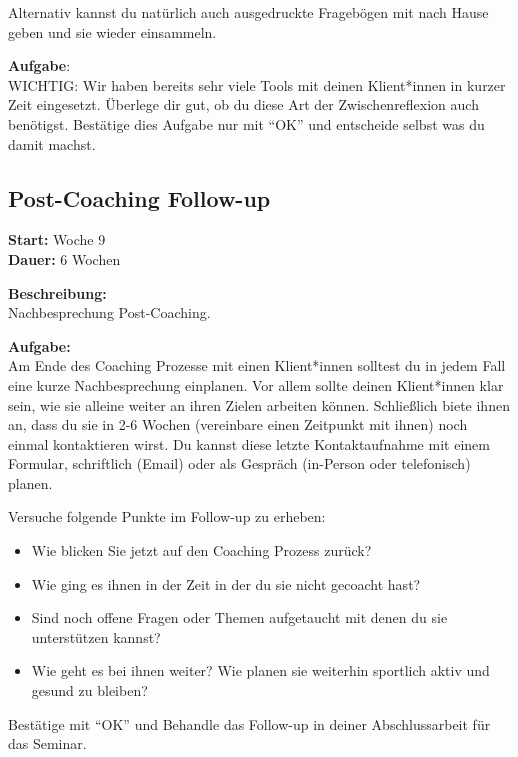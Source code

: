 \documentclass[
  letterpaper,
  DIV=11,
  numbers=noendperiod]{scrreprt}
\begin{document}
Alternativ kannst du natürlich auch ausgedruckte Fragebögen mit nach
Hause geben und sie wieder einsammeln.

\textbf{Aufgabe}:\\
WICHTIG: Wir haben bereits sehr viele Tools mit deinen Klient*innen in
kurzer Zeit eingesetzt. Überlege dir gut, ob du diese Art der
Zwischenreflexion auch benötigst. Bestätige dies Aufgabe nur mit ``OK''
und entscheide selbst was du damit machst.

\subsection{Post-Coaching Follow-up}\label{post-coaching-follow-up}

\textbf{Start:} Woche 9\\
\textbf{Dauer:} 6 Wochen

\textbf{Beschreibung:}\\
Nachbesprechung Post-Coaching.

\textbf{Aufgabe:}\\
Am Ende des Coaching Prozesse mit einen Klient*innen solltest du in
jedem Fall eine kurze Nachbesprechung einplanen. Vor allem sollte deinen
Klient*innen klar sein, wie sie alleine weiter an ihren Zielen arbeiten
können. Schließlich biete ihnen an, dass du sie in 2-6 Wochen
(vereinbare einen Zeitpunkt mit ihnen) noch einmal kontaktieren wirst.
Du kannst diese letzte Kontaktaufnahme mit einem Formular, schriftlich
(Email) oder als Gespräch (in-Person oder telefonisch) planen.

Versuche folgende Punkte im Follow-up zu erheben:

\begin{itemize}
\item
  Wie blicken Sie jetzt auf den Coaching Prozess zurück?
\item
  Wie ging es ihnen in der Zeit in der du sie nicht gecoacht hast?
\item
  Sind noch offene Fragen oder Themen aufgetaucht mit denen du sie
  unterstützen kannst?
\item
  Wie geht es bei ihnen weiter? Wie planen sie weiterhin sportlich aktiv
  und gesund zu bleiben?
\end{itemize}

Bestätige mit ``OK'' und Behandle das Follow-up in deiner
Abschlussarbeit für das Seminar.
\end{document}
